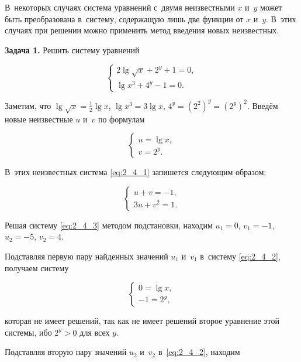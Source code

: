 В~некоторых случаях система уравнений с~двумя неизвестными $x$ и~$y$ может быть
преобразована в~систему, содержащую лишь две функции от $x$ и~$y$.
В~этих случаях при решении можно применить метод введения новых неизвестных.

\textbf{Задача 1.}\label{ex:2_4_1} Решить систему уравнений

\begin{equation}\label{eq:2_4_1}
\begin{cases}
2 \lg \sqrt{x} + 2^{y} + 1 = 0, \\
\lg x^{3} + 4^{y} - 1 = 0.
\end{cases}
\end{equation}

Заметим, что $\displaystyle \lg \sqrt{x} = \frac{1}{2} \lg x$,
$\lg x^{3} = 3 \lg x$, $4^{y} = (2^{2})^{y} = (2^{y})^{2}$.
Введём новые неизвестные $u$ и~$v$ по формулам

\begin{equation}\label{eq:2_4_2}
\begin{cases}
u = \lg x, \\
v = 2^{y}.
\end{cases}
\end{equation}

\noindent
В~этих неизвестных система \eqref{eq:2_4_1} запишется следующим образом:

\begin{equation}\label{eq:2_4_3}
\begin{cases}
u + v = -1, \\
3u + v^{2} = 1.
\end{cases}
\end{equation}

Решая систему \eqref{eq:2_4_3} методом подстановки, находим $u_{1} = 0$, $v_{1} = -1$,
$u_{2} = -5$, $v_{2} = 4$.

Подставляя первую пару найденных значений $u_{1}$ и~$v_{1}$ в~систему \eqref{eq:2_4_2},
получаем систему

\begin{equation*}
\begin{cases}
0 = \lg x, \\
-1 = 2^{y},
\end{cases}
\end{equation*}

\noindent
которая не имеет решений, так как не имеет решений второе уравнение этой системы,
ибо $2^{y} > 0$ для всех $y$.

Подставляя вторую пару значений $u_{2}$ и~$v_{2}$ в~\eqref{eq:2_4_2},
находим

